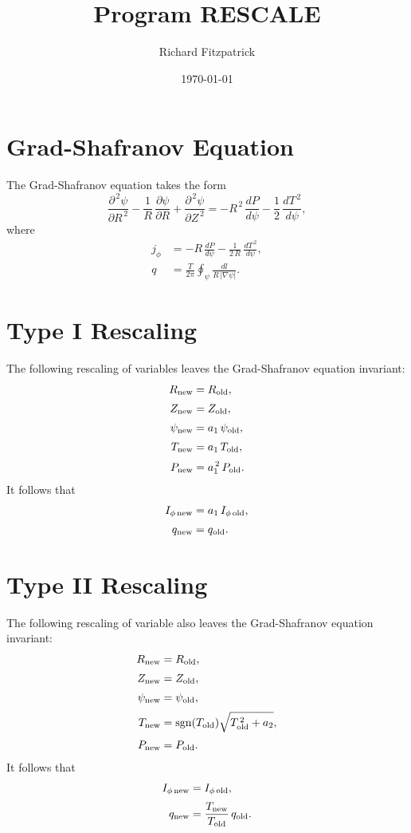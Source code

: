 \documentclass[12pt]{article}
\title{\bf Program {\sc RESCALE}}
\date{\today}
\author{Richard Fitzpatrick}
\begin{document}
\maketitle

\section{Grad-Shafranov Equation}
The Grad-Shafranov equation takes the form
\begin{equation}
\frac{\partial^{\,2}\psi}{\partial R^{\,2}}-\frac{1}{R}\,\frac{\partial\psi}{\partial R} + \frac{\partial^{\,2}\psi}{\partial Z^{\,2}} = -R^{\,2}\,\frac{dP}{d\psi} - \frac{1}{2}\,\frac{dT^{\,2}}{d\psi},
\end{equation}
where
\begin{align}
j_\phi &= -R\,\frac{dP}{d\psi}- \frac{1}{2\,R}\,\frac{dT^{\,2}}{d\psi},\\[0.5ex]
q &= \frac{T}{2\pi}\oint_\psi \frac{dl}{R\,|\nabla \psi|}.
\end{align}

\section{Type I Rescaling}
The following rescaling of variables leaves the Grad-Shafranov equation invariant:
\begin{align}
R_{\rm new}&=R_{\rm old},\\[0.5ex]
Z_{\rm new}&=Z_{\rm old},\\[0.5ex]
\psi_{\rm new} &= a_1\,\psi_{\rm old},\\[0.5ex]
T_{\rm new} &=a_1\,T_{\rm old},\\[0.5ex]
P_{\rm new} &=a_1^{\,2}\,P_{\rm old}.
\end{align}
It follows that
\begin{align}
I_{\phi\,{\rm new}} &= a_1\,I_{\phi\,{\rm old}},\\[0.5ex]
q_{\rm new} &= q_{\rm old}.
\end{align} 

\section{Type II Rescaling}
The following rescaling of variable also leaves the Grad-Shafranov equation invariant:
\begin{align}
R_{\rm new}&=R_{\rm old},\\[0.5ex]
Z_{\rm new}&=Z_{\rm old},\\[0.5ex]
\psi_{\rm new} &=\psi_{\rm old},\\[0.5ex]
T_{\rm new} &={\rm sgn}(T_{\rm old})\sqrt{T_{\rm old}^{\,2}+a_2},\\[0.5ex]
P_{\rm new} &=P_{\rm old}.
\end{align}
It follows that
\begin{align}
I_{\phi\,{\rm new}} &=I_{\phi\,{\rm old}},\\[0.5ex]
q_{\rm new} &= \frac{T_{\rm new}}{T_{\rm old}}\,q_{\rm old}.
\end{align} 
\end{document}
